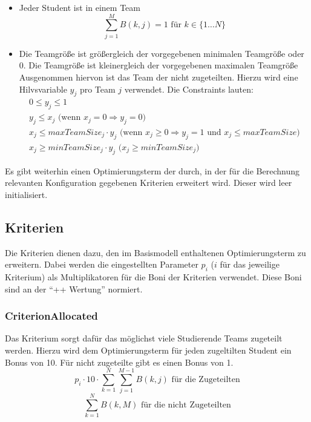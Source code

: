 \documentclass[parskip=full]{scrartcl}
\begin{document}
 \begin{itemize}
   \item Jeder Student ist in einem Team \begin{equation*}
   \sum_{j = 1}^{M} B(k,j) = 1 \text{ für } k \in \{ 1\ldots N \}
   \end{equation*}
   \item Die Teamgröße ist größergleich der vorgegebenen minimalen Teamgröße
   oder 0. Die Teamgröße ist kleinergleich der vorgegebenen maximalen Teamgröße
   Ausgenommen hiervon ist das Team der nicht zugeteilten. Hierzu wird eine
   Hilvsvariable $y_j$ pro Team $j$ verwendet. Die Constraints lauten:
   \begin{gather*}
    0 \le y_j \le 1\\
     y_j \le x_j\text{ (wenn } x_j = 0 \Rightarrow y_j = 0
    \text{)} \\ 
    x_j \le maxTeamSize_j \cdot y_j \text{ (wenn } x_j \geq 0 \Rightarrow y_j
    = 1 \text{ und } x_j \le maxTeamSize \text{)} \\
    x_j \ge minTeamSize_j \cdot y_j \text{ (} x_j \ge minTeamSize_j \text{)}
   \end{gather*}
 \end{itemize}
 
 Es gibt weiterhin einen Optimierungsterm der durch, in der für die Berechnung
 relevanten Konfiguration gegebenen Kriterien erweitert wird. Dieser wird leer
 initialisiert.


\subsection{Kriterien}
Die Kriterien dienen dazu, den im Basismodell enthaltenen Optimierungsterm zu
erweitern. Dabei werden die eingestellten Parameter $p_i$ ($i$ für das
jeweilige Kriterium) als Multiplikatoren für die Boni der Kriterien verwendet.
Diese Boni sind an der \enquote{++ Wertung} normiert. 

\subsubsection{CriterionAllocated}
Das Kriterium sorgt dafür das möglichst viele Studierende Teams zugeteilt
werden. Hierzu wird dem Optimierungsterm für jeden zugeltilten Student ein Bonus
von 10. Für nicht zugeteilte gibt es einen Bonus von 1. \begin{equation*}
p_i \cdot 10 \cdot \sum_{k = 1}^{N} \sum_{j = 1}^{M-1} B(k,j) \text{ für die
Zugeteilten}
\end{equation*}
\begin{equation*}
\sum_{k = 1}^{N} B(k,M) \text{ für die nicht
Zugeteilten}
\end{equation*}
\end{document}
